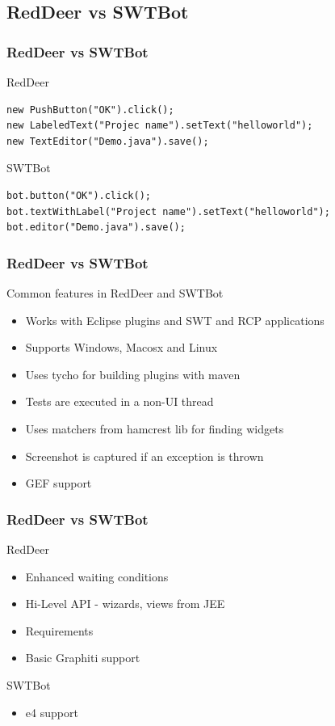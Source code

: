 \documentclass{beamer}
\begin{document}
\subsection{RedDeer vs SWTBot}
\begin{frame}[fragile]
\frametitle{RedDeer vs SWTBot}
RedDeer  
\begin{lstlisting}
new PushButton("OK").click();
new LabeledText("Projec name").setText("helloworld");
new TextEditor("Demo.java").save();
\end{lstlisting}
\vspace{0.5cm}
SWTBot
\begin{lstlisting}
bot.button("OK").click();
bot.textWithLabel("Project name").setText("helloworld");
bot.editor("Demo.java").save();
\end{lstlisting}
\end{frame}

\begin{frame}[fragile]
\frametitle{RedDeer vs SWTBot}
Common features in RedDeer and SWTBot
\begin{itemize}
\item Works with Eclipse plugins and SWT and RCP applications
\item Supports Windows, Macosx and Linux
\item Uses tycho for building plugins with maven
\item Tests are executed in a non-UI thread
\item Uses matchers from hamcrest lib for finding widgets
\item Screenshot is captured if an exception is thrown
\item GEF support
\end{itemize}
\end{frame}

\begin{frame}[fragile]
\frametitle{RedDeer vs SWTBot}
RedDeer
\begin{itemize}
\item Enhanced waiting conditions
\item Hi-Level API - wizards, views from JEE
\item Requirements
\item Basic Graphiti support
\end{itemize}
\vspace{0.5cm}
SWTBot
\begin{itemize}
\item e4 support
\end{itemize}
\end{frame}
\end{document}
